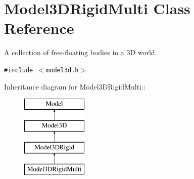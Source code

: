 \section{Model3DRigid\-Multi  Class Reference}
\label{classModel3DRigidMulti}
A collection of free-floating bodies in a 3D world. 


{\tt \#include $<$model3d.h$>$}

Inheritance diagram for Model3DRigid\-Multi::\begin{figure}[H]
\begin{center}
\leavevmode
\includegraphics[height=4cm]{classModel3DRigidMulti}
\end{center}
\end{figure}
